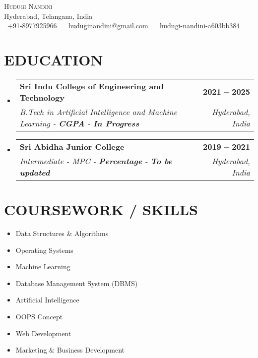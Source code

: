\documentclass[letterpaper,11pt]{article}
\makeatletter
\newcommand{\resumeSubheading}[4]{
  \vspace{-2pt}\item
    \begin{tabular*}{1.0\textwidth}[t]{l@{\extracolsep{\fill}}r}
      \textbf{\large#1} & \textbf{\small #2} \\
      \textit{\large#3} & \textit{\small #4} \\
     
    \end{tabular*}\vspace{-7pt}
}
\newcommand{\resumeSubHeadingListStart}{\begin{itemize}[leftmargin=0.0in, label={}]}
\newcommand{\resumeSubHeadingListEnd}{\end{itemize}}
\makeatother
\begin{document}




\begin{center}
    {\Huge \scshape Hudugi Nandini} \\ \vspace{1pt}
    Hyderabad, Telangana, India \\ \vspace{1pt}
    \small \href{tel:+918977925966}{ \raisebox{-0.1\height}\faPhone\ \underline{+91-8977925966} ~} \href{mailto:huduginandini@gmail.com}{\raisebox{-0.2\height}\faEnvelope\  \underline{huduginandini@gmail.com}} ~
    \href{https://www.linkedin.com/in/hudugi-nandini-a603bb384}{\raisebox{-0.2\height}\faLinkedinSquare\ \underline{hudugi-nandini-a603bb384}}
    \vspace{-8pt}
\end{center}




\section{EDUCATION}
  \resumeSubHeadingListStart
    \resumeSubheading
      {Sri Indu College of Engineering and Technology}{2021 -- 2025}
      {B.Tech in Artificial Intelligence and Machine Learning - \textbf{CGPA} - \textbf{In Progress}}{Hyderabad, India}
  \resumeSubHeadingListEnd
 
  \resumeSubHeadingListStart
    \resumeSubheading
      {Sri Abidha Junior College}{2019 -- 2021}
      {Intermediate - MPC - \textbf{Percentage} - \textbf{To be updated}}{Hyderabad, India}
  \resumeSubHeadingListEnd


\section{COURSEWORK / SKILLS}
        \begin{multicols}{4}
            \begin{itemize}[itemsep=-2pt, parsep=5pt]
                \item Data Structures \& Algorithms
                \item Operating Systems
                \item Machine Learning
                \item Database Management System (DBMS)
               \item Artificial Intelligence
                \item OOPS Concept
                \item Web Development
                \item Marketing \& Business Development
            \end{itemize}
        \end{multicols}
        \vspace*{2.0\multicolsep}
\end{document}
